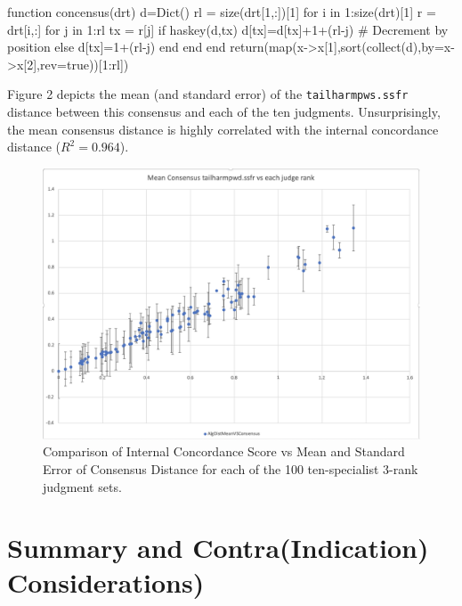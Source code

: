 \documentclass{article}
\begin{document}
\begin{algorithm}
	\caption{$Consensus(judgmentSet)$}
	\begin{algorithmic}[1]
\State function concensus(drt)
    \State d=Dict()
    \State rl = size(drt[1,:])[1]
    \State for i in 1:size(drt)[1]
        \State r = drt[i,:]
        \State for j in 1:rl
            \State tx = r[j]
            \State if haskey(d,tx)
                \State d[tx]=d[tx]+1+(rl-j) # Decrement by position
            \State else
            \State     d[tx]=1+(rl-j)
            \State end
        \State end
    \State end
    \State return(map(x->x[1],sort(collect(d),by=x->x[2],rev=true))[1:rl])
	\end{algorithmic} 
\end{algorithm} 

Figure 2 depicts the mean (and standard error) of the \texttt{tailharmpws.ssfr} distance between this consensus and each of the ten judgments. Unsurprisingly, the mean consensus distance is highly correlated with the internal concordance distance ($R^2=0.964$). 

\begin{figure}[h!]
  \includegraphics[scale=0.5]{"20220504_ConsensusComparison"}
  \caption{Comparison of Internal Concordance Score vs Mean and Standard Error of Consensus Distance for each of the 100 ten-specialist 3-rank judgment sets.}
\end{figure}

\section{Summary and Contra(Indication) Considerations)}
\end{document}
